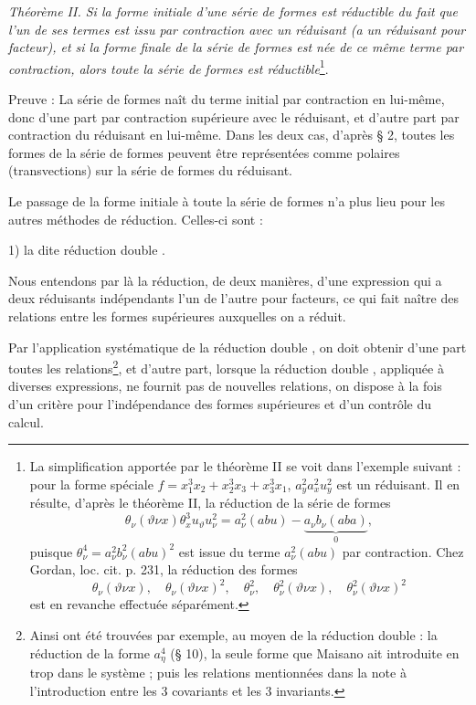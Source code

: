 \documentclass[11pt]{article}
\begin{document}
\emph{Théorème II. Si la forme initiale d'une série de formes est réductible du fait que l'un de ses termes est issu par contraction avec un réduisant (a un réduisant pour facteur), et si la forme finale de la série de formes est née de ce même terme par contraction, alors toute la série de formes est réductible}\footnote{La simplification apportée par le théorème II se voit dans l'exemple suivant : pour la forme spéciale $f=x_1^3x_2+x_2^3x_3+x_3^3x_1$, $a_y^2a_x^2u_y^2$ est un réduisant. Il en résulte, d'après le théorème II, la réduction de la série de formes
\[
\theta_\nu(\vartheta\nu x)\theta_x^3u_\vartheta u_\nu^2
=
a_\nu^2(abu)-\underbrace{a_\nu b_\nu(aba)}_{0},
\]
puisque $\theta_\nu^4=a_\nu^2b_\nu^2(abu)^2$ est issue du terme $a_\nu^2(abu)$ par contraction. Chez Gordan, loc. cit. p. 231, la réduction des formes
\[
\theta_\nu(\vartheta\nu x),\quad \theta_\nu(\vartheta\nu x)^2,\quad
\theta_\nu^2,\quad \theta_\nu^2(\vartheta\nu x),\quad
\theta_\nu^2(\vartheta\nu x)^2
\]
est en revanche effectuée séparément.}.

Preuve : La série de formes naît du terme initial par contraction en lui-même, donc d'une part par contraction supérieure avec le réduisant, et d'autre part par contraction du réduisant en lui-même. Dans les deux cas, d'après \S{} 2, toutes les formes de la série de formes peuvent être représentées comme polaires (transvections) sur la série de formes du réduisant.

Le passage de la forme initiale à toute la série de formes n'a plus lieu pour les autres méthodes de réduction. Celles-ci sont :

1) la dite \og{} réduction double \fg{}.

Nous entendons par là la réduction, de deux manières, d'une expression qui a deux réduisants indépendants l'un de l'autre pour facteurs, ce qui fait naître des relations entre les formes supérieures auxquelles on a réduit.

Par l'application systématique de la \og{} réduction double \fg{}, on doit obtenir d'une part toutes les relations\footnote{Ainsi ont été trouvées par exemple, au moyen de la \og{} réduction double \fg{} : la réduction de la forme $a_\eta^4$ (\S{} 10), la seule forme que Maisano ait introduite en trop dans le système ; puis les relations mentionnées dans la note à l'introduction entre les 3 covariants et les 3 invariants.}, et d'autre part, lorsque la \og{} réduction double \fg{}, appliquée à diverses expressions, ne fournit pas de nouvelles relations, on dispose à la fois d'un critère pour l'indépendance des formes supérieures et d'un contrôle du calcul.
\end{document}

